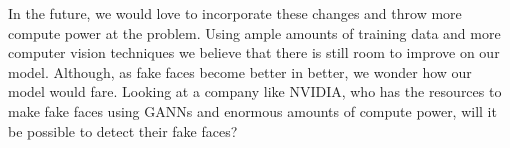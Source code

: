 \documentclass[11pt, letterpaper]{article}
\begin{document}
\begin{multicols}{2}
  In the future, we would love to incorporate these changes and throw more
  compute power at the problem. Using ample amounts of training data and more
  computer vision techniques we believe that there is still room to improve on
  our model. Although, as fake faces become better in better, we wonder how our
  model would fare. Looking at a company like NVIDIA, who has the resources to
  make fake faces using GANNs and enormous amounts of compute power, will it be
  possible to detect their fake faces?

\end{multicols}



\end{document}

